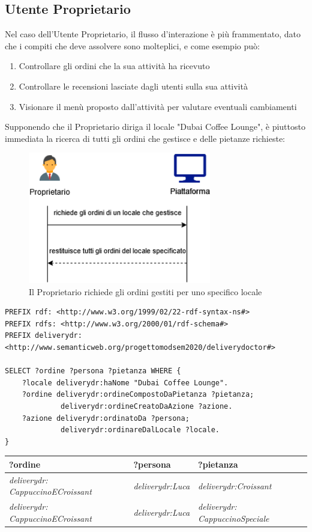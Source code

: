 \documentclass[12pt]{article}
\begin{document}
\subsection{Utente Proprietario}
Nel caso dell'Utente Proprietario, il flusso d'interazione è più frammentato, dato che i compiti che deve assolvere sono molteplici, e come esempio può:
\begin{enumerate}
    \item Controllare gli ordini che la sua attività ha ricevuto
    \item Controllare le recensioni lasciate dagli utenti sulla sua attività
    \item Visionare il menù proposto dall'attività per valutare eventuali cambiamenti
\end{enumerate}
Supponendo che il Proprietario diriga il locale "Dubai Coffee Lounge", è piuttosto immediata la ricerca di tutti gli ordini che gestisce e delle pietanze richieste:
\begin{figure}[H]
    \centering
         \includegraphics[width=8cm]{files/Proprietario 1.png}
    \caption{Il Proprietario richiede gli ordini gestiti per uno specifico locale}
\end{figure}
\begin{lstlisting}[language=SPARQL]
PREFIX rdf: <http://www.w3.org/1999/02/22-rdf-syntax-ns#>
PREFIX rdfs: <http://www.w3.org/2000/01/rdf-schema#>
PREFIX deliverydr:
<http://www.semanticweb.org/progettomodsem2020/deliverydoctor#>

SELECT ?ordine ?persona ?pietanza WHERE {
    ?locale deliverydr:haNome "Dubai Coffee Lounge".
    ?ordine deliverydr:ordineCompostoDaPietanza ?pietanza;
             deliverydr:ordineCreatoDaAzione ?azione.
    ?azione deliverydr:ordinatoDa ?persona;
             deliverydr:ordinareDalLocale ?locale.
}
\end{lstlisting}
\begin{tabularx}{\textwidth} {
  | >{\centering\arraybackslash}X 
  | >{\centering\arraybackslash}X
  | >{\centering\arraybackslash}X |}
 \hline
 \textbf{?ordine} & \textbf{?persona} & \textbf{?pietanza} \\
 \hline
 \textit{deliverydr: CappuccinoECroissant} & \textit{deliverydr:Luca} & \textit{deliverydr:Croissant} \\
 \hline
 \textit{deliverydr: CappuccinoECroissant} & \textit{deliverydr:Luca} & \textit{deliverydr: CappuccinoSpeciale}  \\
 \hline
\end{tabularx}
\end{document}
